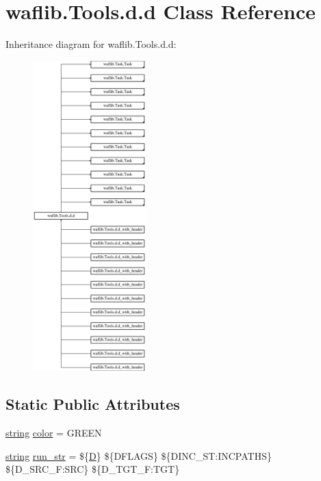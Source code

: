 \hypertarget{classwaflib_1_1_tools_1_1d_1_1d}{}\section{waflib.\+Tools.\+d.\+d Class Reference}
\label{classwaflib_1_1_tools_1_1d_1_1d}
Inheritance diagram for waflib.\+Tools.\+d.\+d\+:\begin{figure}[H]
\begin{center}
\leavevmode
\includegraphics[height=12.000000cm]{classwaflib_1_1_tools_1_1d_1_1d}
\end{center}
\end{figure}
\subsection*{Static Public Attributes}
\begin{DoxyCompactItemize}
\item 
\hyperlink{test__lib_f_l_a_c_2format_8c_ab02026ad0de9fb6c1b4233deb0a00c75}{string} \hyperlink{classwaflib_1_1_tools_1_1d_1_1d_a41978a80eab929f2c357f60271f98eb1}{color} = \textquotesingle{}G\+R\+E\+EN\textquotesingle{}
\item 
\hyperlink{test__lib_f_l_a_c_2format_8c_ab02026ad0de9fb6c1b4233deb0a00c75}{string} \hyperlink{classwaflib_1_1_tools_1_1d_1_1d_a19fcda55ff63e305a3e131e159e02e21}{run\+\_\+str} = \textquotesingle{}\$\{\hyperlink{trigger_8c_af316c33cc298530f245e8b55330e86b5}{D}\} \$\{D\+F\+L\+A\+GS\} \$\{D\+I\+N\+C\+\_\+\+S\+T\+:\+I\+N\+C\+P\+A\+T\+HS\} \$\{D\+\_\+\+S\+R\+C\+\_\+\+F\+:\+S\+RC\} \$\{D\+\_\+\+T\+G\+T\+\_\+\+F\+:\+T\+GT\}\textquotesingle{}
\end{DoxyCompactItemize}
